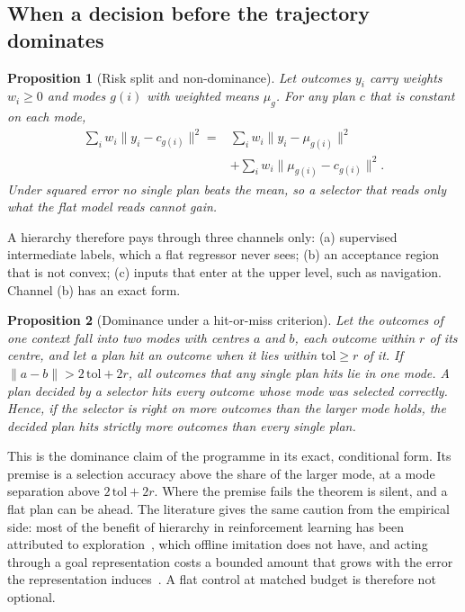 \documentclass[10pt,twocolumn]{article}
\newtheorem{proposition}{Proposition}
\theoremstyle{remark}
\begin{document}
\subsection{When a decision before the trajectory dominates}
\begin{proposition}[Risk split and non-dominance]\label{prop:split}
Let outcomes $y_i$ carry weights $w_i\ge0$ and modes $g(i)$ with weighted means $\mu_g$. For any plan $c$ that is constant on each mode,
\begin{equation}
\begin{aligned}
\sum_i w_i\|y_i-c_{g(i)}\|^2={}&\sum_i w_i\|y_i-\mu_{g(i)}\|^2\\
&+\sum_i w_i\|\mu_{g(i)}-c_{g(i)}\|^2 .
\end{aligned}
\end{equation}
Under squared error no single plan beats the mean, so a selector that reads only what the flat model reads cannot gain.
\end{proposition}
\noindent A hierarchy therefore pays through three channels only: (a) supervised intermediate labels, which a flat regressor never
sees; (b) an acceptance region that is not convex; (c) inputs that enter at the upper level, such as navigation. Channel (b) has an
exact form.
\begin{proposition}[Dominance under a hit-or-miss criterion]\label{prop:dom}
Let the outcomes of one context fall into two modes with centres $a$ and $b$, each outcome within $r$ of its centre, and let a plan hit
an outcome when it lies within $\mathrm{tol}\ge r$ of it. If $\|a-b\|>2\,\mathrm{tol}+2r$, all outcomes that any single plan hits lie in
one mode. A plan decided by a selector hits every outcome whose mode was selected correctly. Hence, if the selector is right on more
outcomes than the larger mode holds, the decided plan hits strictly more outcomes than every single plan.
\end{proposition}
\noindent This is the dominance claim of the programme in its exact, conditional form. Its premise is a selection accuracy above the
share of the larger mode, at a mode separation above $2\,\mathrm{tol}+2r$. Where the premise fails the theorem is silent, and a flat
plan can be ahead. The literature gives the same caution from the empirical side: most of the benefit of hierarchy in reinforcement
learning has been attributed to exploration~\cite{nachum19}, which offline imitation does not have, and acting through a goal
representation costs a bounded amount that grows with the error the representation induces~\cite{nachum18}. A flat control at matched
budget is therefore not optional.
\end{document}
